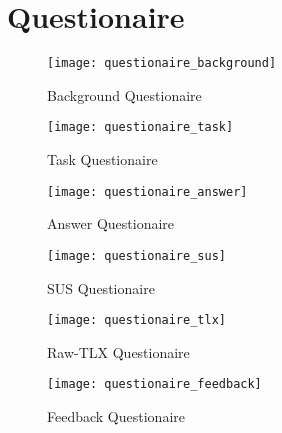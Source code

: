 \chapter{Questionaire}\label{sec:appendix}

\begin{figure*}[!htb]
  \centering
  \texttt{[image: questionaire\_background]}
  \caption{Background Questionaire}
  \label{fig:questionaire_background}
\end{figure*}

\begin{figure*}[!htb]
  \centering
  \texttt{[image: questionaire\_task]}
  \caption{Task Questionaire}
  \label{fig:questionaire_task}
\end{figure*}

\begin{figure*}[!htb]
  \centering
  \texttt{[image: questionaire\_answer]}
  \caption{Answer Questionaire}
  \label{fig:questionaire_answer}
\end{figure*}

\begin{figure*}[!htb]
  \centering
  \texttt{[image: questionaire\_sus]}
  \caption{SUS Questionaire}
  \label{fig:questionaire_sus}
\end{figure*}

\begin{figure*}[!htb]
  \centering
  \texttt{[image: questionaire\_tlx]}
  \caption{Raw-TLX Questionaire}
  \label{fig:questionaire_tlx}
\end{figure*}

\begin{figure*}[!htb]
  \centering
  \texttt{[image: questionaire\_feedback]}
  \caption{Feedback Questionaire}
  \label{fig:questionaire_feedback}
\end{figure*}
